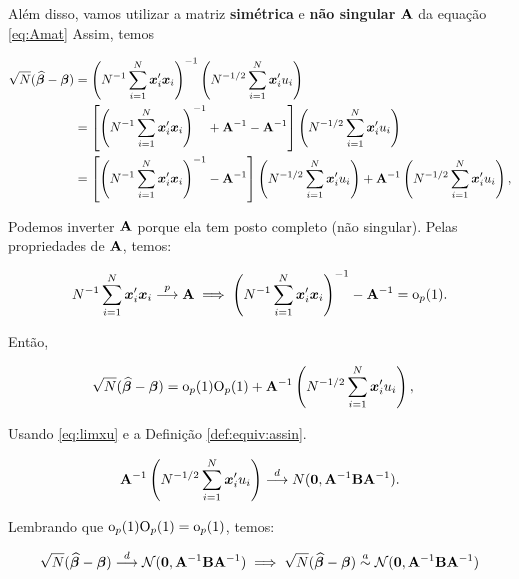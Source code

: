 \documentclass[11pt, oneside, a4paper, article]{article}
\numberwithin{equation}{section}
\begin{document}
\vspace{1 em}
Além disso, vamos utilizar a matriz \textbf{simétrica} e \textbf{não singular} $\mathbf{A}$ da equação \eqref{eq:Amat}
Assim, temos 

\vspace{-1 em}
\begin{align*}
\sqrt{N} (\widehat{\boldsymbol{\beta}} - \boldsymbol{\beta}) &=
\left( N^{-1} \sum_{i=1}^{N} \boldsymbol{x}_{i}' \boldsymbol{x}_{i} \right)^{-1}
\left( N^{-1/2} \sum_{i=1}^{N} \boldsymbol{x}_{i}' u_{i} \right)
\\ &=
\left[ 
\left( N^{-1} \sum_{i=1}^{N} \boldsymbol{x}_{i}' \boldsymbol{x}_{i} \right)^{-1} 
+ \mathbf{A}^{-1} - \mathbf{A}^{-1}
\right]
\left( N^{-1/2} \sum_{i=1}^{N} \boldsymbol{x}_{i}' u_{i} \right)
\\ &=
\left[ 
\left( N^{-1} \sum_{i=1}^{N} \boldsymbol{x}_{i}' \boldsymbol{x}_{i} \right)^{-1} 
- \mathbf{A}^{-1}
\right]
\left( N^{-1/2} \sum_{i=1}^{N} \boldsymbol{x}_{i}' u_{i} \right)
+ \mathbf{A}^{-1} 
\left( N^{-1/2} \sum_{i=1}^{N} \boldsymbol{x}_{i}' u_{i} \right),
\end{align*}

\noident
Podemos inverter $\mathbf{A}$ porque ela tem posto completo (não singular).
Pelas propriedades de $\mathbf{A}$, temos:

\vspace{-1 em}
\begin{align*}
N^{-1} \sum_{i=1}^{N} \boldsymbol{x}_{i}' \boldsymbol{x}_{i}  \overset{p}{\longrightarrow}  \mathbf{A}
\implies
\left( N^{-1} \sum_{i=1}^{N} \boldsymbol{x}_{i}' \boldsymbol{x}_{i} \right)^{-1}  - \mathbf{A}^{-1} = \text{o}_{p}(1).
\end{align*}

Então,

\vspace{-1 em}
\begin{align*}
\sqrt{N} (\widehat{\boldsymbol{\beta}} - \boldsymbol{\beta}) &=
\text{o}_{p}(1) \text{O}_{p}(1)
+ \mathbf{A}^{-1} \left( N^{-1/2} \sum_{i=1}^{N} \boldsymbol{x}_{i}' u_{i} \right),
\end{align*}

Usando \eqref{eq:limxu} e a Definição \ref{def:equiv:assin}.

\begin{align*}
\mathbf{A}^{-1} \left( N^{-1/2} \sum_{i=1}^{N} \boldsymbol{x}_{i}' u_{i} \right)
 \overset{d}{\longrightarrow}  
N(\boldsymbol{0}, \mathbf{A}^{-1} \mathbf{B} \mathbf{A}^{-1}).
\end{align*}

Lembrando que $\text{o}_{p}(1) \text{O}_{p}(1) = \text{o}_{p}(1)$, temos:

\vspace{-1 em}
\begin{align*}
\sqrt{N} (\widehat{\boldsymbol{\beta}} - \boldsymbol{\beta})  \overset{d}{\longrightarrow}  \mathcal{N}(\boldsymbol{0}, \mathbf{A}^{-1} \mathbf{B} \mathbf{A}^{-1})
\implies
\sqrt{N} (\widehat{\boldsymbol{\beta}} - \boldsymbol{\beta}) \overset{a}{\sim} \mathcal{N}(\boldsymbol{0}, \mathbf{A}^{-1} \mathbf{B} \mathbf{A}^{-1})
\end{align*}
\end{document}
